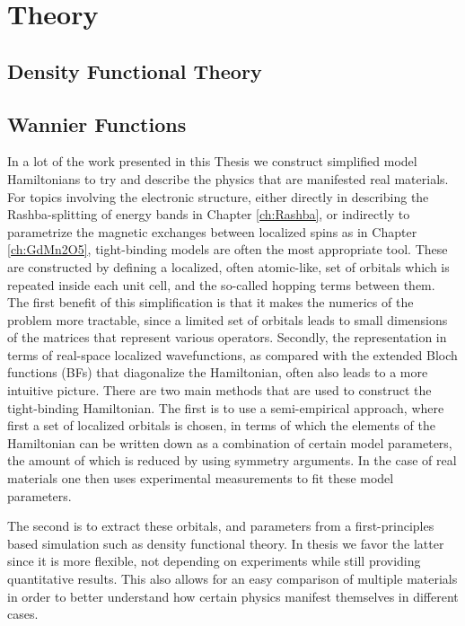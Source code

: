 \chapter{Theory}

\section{Density Functional Theory \label{sec:DFT}}




\section{Wannier Functions \label{sec:Wannier}}

In a lot of the work presented in this Thesis we construct simplified model Hamiltonians to try and describe the physics that are manifested real materials.
For topics involving the electronic structure, either directly in describing the Rashba-splitting of energy bands in Chapter \ref{ch:Rashba}, or indirectly to parametrize the magnetic exchanges between localized spins as in Chapter \ref{ch:GdMn2O5}, tight-binding models are often the most appropriate tool.
These are constructed by defining a localized, often atomic-like, set of orbitals which is repeated inside each unit cell, and the so-called hopping terms between them.
The first benefit of this simplification is that it makes the numerics of the problem more tractable, since a limited set of orbitals leads to small dimensions of the matrices that represent various operators.
Secondly, the representation in terms of real-space localized wavefunctions, as compared with the extended Bloch functions (BFs) that diagonalize the Hamiltonian, often also leads to a more intuitive picture.
There are two main methods that are used to construct the tight-binding Hamiltonian.
The first is to use a semi-empirical approach, where first a set of localized orbitals is chosen, in terms of which the elements of the Hamiltonian can be written down as a combination of certain model parameters, the amount of which is reduced by using symmetry arguments.
In the case of real materials one then uses experimental measurements to fit these model parameters.

The second is to extract these orbitals, and parameters from a first-principles based simulation such as density functional theory.
In thesis we favor the latter since it is more flexible, not depending on experiments while still providing quantitative results.
This also allows for an easy comparison of multiple materials in order to better understand how certain physics manifest themselves in different cases. 

